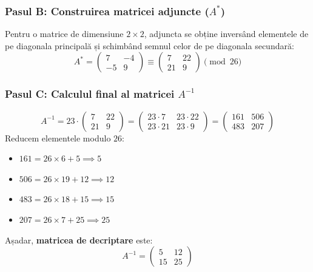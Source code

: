\documentclass[12pt]{article}
\begin{document}
\subsubsection*{Pasul B: Construirea matricei adjuncte ($A^*$)}
Pentru o matrice de dimensiune $2 \times 2$, adjuncta se obține inversând elementele de pe diagonala principală și schimbând semnul celor de pe diagonala secundară:
\[
A^* = \begin{pmatrix} 7 & -4 \\ -5 & 9 \end{pmatrix} \equiv \begin{pmatrix} 7 & 22 \\ 21 & 9 \end{pmatrix} \pmod{{26}}
\]

\subsubsection*{Pasul C: Calculul final al matricei $A^{-1}$}
\[
A^{-1} = 23 \cdot \begin{pmatrix} 7 & 22 \\ 21 & 9 \end{pmatrix} = \begin{pmatrix} 23 \cdot 7 & 23 \cdot 22 \\ 23 \cdot 21 & 23 \cdot 9 \end{pmatrix} = \begin{pmatrix} 161 & 506 \\ 483 & 207 \end{pmatrix}
\]
Reducem elementele modulo $26$:
\begin{itemize}
    \item $161 = 26 \times 6 + 5 \implies 5$
    \item $506 = 26 \times 19 + 12 \implies 12$
    \item $483 = 26 \times 18 + 15 \implies 15$
    \item $207 = 26 \times 7 + 25 \implies 25$
\end{itemize}
Așadar, \textbf{matricea de decriptare} este:
\[
A^{-1} = \begin{pmatrix} 5 & 12 \\ 15 & 25 \end{pmatrix}
\]
\end{document}
